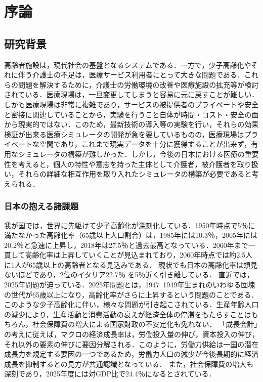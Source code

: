 \chapter{序論}

\section{研究背景}

高齢者施設は，現代社会の基盤となるシステムである．一方で，少子高齢化やそれに伴う介護士の不足は，医療サービス利用者にとって大きな問題である．これらの問題を解決するために，介護士の労働環境の改善や医療施設の拡充等が検討されている．医療現場は，一旦変更してしまうと容易に元に戻すことが難しい．しかも医療現場は非常に複雑であり，サービスの被提供者のプライベートや安全と密接に関連していることから，実験を行うこと自体が時間・コスト・安全の面から現実的ではない．このため，最新技術の導入等の実験を行い，それらの効果検証が出来る医療シミュレータの開発が急を要しているものの，医療現場はプライベートな空間であり，これまで現実データを十分に獲得することが出来ず，有用なシミュレータの構築が難しかった．しかし，今後の日本における医療の重要性を考えると，個人の特性や意志を持った主体として介護者，被介護者を取り扱い，それらの詳細な相互作用を取り入れたシミュレータの構築が必要であると考えられる．

\subsection{日本の抱える諸課題}

我が国では，世界に先駆けて少子高齢化が深刻化している．1950年時点で5％に満たなかった高齢化率（65歳以上人口割合）は，1985年には10.3％，2005年には20.2％と急速に上昇し，2018年は27.5％と過去最高となっている．2060年まで一貫して高齢化率は上昇していくことが見込まれており，2060年時点では約2.5人に1人が65歳以上の高齢者となる見込みである\cite{ex_kousei_v1}．
現状でも日本の高齢化率は類見ないほどであり，2位のイタリア22.7％ を5％近く引き離している．
直近では，2025年問題が迫っている．2025年問題とは，1947~1949年生まれのいわゆる団塊の世代が65歳以上になり，高齢化率がさらに上昇するという問題のことである\cite{2025_problem}．
このような少子高齢化に伴い，様々な問題が引き起こされている．生産年齢人口の減少により，生産活動と消費活動の衰えが経済全体の停滞をもたらすことはもちろん，社会保障費の増大による国家財政の不安定化も免れない．
「成長会計」の考えに従えば，マクロの経済成長率は，労働投入量の伸び，資本投入の伸び，それ以外の要素の伸びに要因分解される．このように，労働力供給は一国の潜在成長力を規定する要因の一つであるため，労働力人口の減少が今後長期的に経済成長を抑制するとの見方が共通認識となっている\cite{population_GDP_relation}．
また，社会保障費の増大も深刻であり，2025年度には対GDP比で24.4％になるとされている\cite{social_security}．

